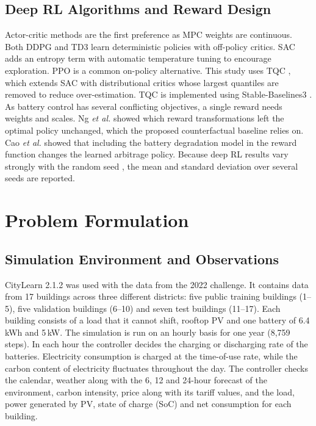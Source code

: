 \documentclass[conference]{IEEEtran}
\begin{document}
\subsection{Deep RL Algorithms and Reward Design}
Actor-critic methods are the first preference as MPC weights are continuous. Both DDPG \cite{lillicrap2016ddpg} and TD3
\cite{fujimoto2018td3} learn deterministic policies with off-policy critics. SAC \cite{haarnoja2018sac} adds an entropy
term with automatic temperature tuning to encourage exploration. PPO \cite{schulman2017ppo} is a common on-policy
alternative. This study uses TQC \cite{kuznetsov2020tqc}, which extends SAC with distributional critics whose largest
quantiles are removed to reduce over-estimation. TQC is implemented using Stable-Baselines3 \cite{raffin2021sb3}. As
battery control has several conflicting objectives, a single reward needs weights and scales. Ng \emph{et al.}
\cite{ng1999shaping} showed which reward transformations left the optimal policy unchanged, which the proposed counterfactual baseline relies on. Cao \emph{et al.} \cite{cao2020arbitrage} showed that including the battery degradation model in the
reward function changes the learned arbitrage policy. Because deep RL results vary strongly with the random seed
\cite{henderson2018matters,agarwal2021precipice}, the mean and standard deviation over several seeds are reported.

\section{Problem Formulation}\label{sec:problem}

\subsection{Simulation Environment and Observations}
CityLearn 2.1.2 was used with the data from the 2022 challenge. It contains data from 17 buildings across three
different districts: five public training buildings (1--5), five validation buildings (6--10) and seven test buildings
(11--17). Each building consists of a load that it cannot shift, rooftop PV and one battery of 6.4\,kWh and 5\,kW. The
simulation is run on an hourly basis for one year (8{,}759 steps). In each hour the controller decides the charging or
discharging rate of the batteries. Electricity consumption is charged at the time-of-use rate, while the carbon content
of electricity fluctuates throughout the day. The controller checks the calendar, weather along with the 6, 12 and
24-hour forecast of the environment, carbon intensity, price along with its tariff values, and the load, power generated
by PV, state of charge (SoC) and net consumption for each building.
\end{document}
